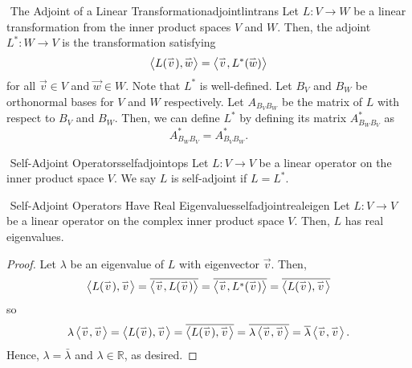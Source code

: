         \begin{definition}{\Stop\,\,The Adjoint of a Linear Transformation}{adjointlintrans}
            Let \(L:V\to W\) be a linear transformation from the inner product spaces \(V\) and \(W\). Then, the adjoint \(L^*:W\to V\) is the transformation satisfying
            \begin{equation*}
                \left\langle L(\overset{_{\rightharpoonup}}{v}),\overset{_{\rightharpoonup}}{w}\right\rangle=\left\langle \overset{_{\rightharpoonup}}{v},L^*(\overset{_{\rightharpoonup}}{w})\right\rangle
            \end{equation*}
            for all \(\vec{v}\in V\) and \(\vec{w}\in W\). Note that \(L^*\) is well-defined. Let \(B_V\) and \(B_W\) be orthonormal bases for \(V\) and \(W\) respectively. Let \(A_{B_VB_W}\) be the matrix of \(L\) with respect to \(B_V\) and \(B_W\). Then, we can define \(L^*\) by defining its matrix \(A^*_{B_WB_V}\) as
            \begin{equation*}
                A^*_{B_WB_V}=A_{B_VB_W}^*.
            \end{equation*}
        \end{definition}
        \begin{definition}{\Stop\,\,Self-Adjoint Operators}{selfadjointops}
            Let \(L:V\to V\) be a linear operator on the inner product space \(V\). We say \(L\) is self-adjoint if \(L=L^*\).
        \end{definition}
        \begin{theorem}{\Stop\,\,Self-Adjoint Operators Have Real Eigenvalues}{selfadjointrealeigen}
            Let \(L:V\to V\) be a linear operator on the complex inner product space \(V\). Then, \(L\) has real eigenvalues.
            \begin{proof}
                Let \(\lambda\) be an eigenvalue of \(L\) with eigenvector \(\vec{v}\). Then,
                \begin{equation*}
                    \left\langle L(\overset{_{\rightharpoonup}}{v}),\overset{_{\rightharpoonup}}{v}\right\rangle=\overline{\left\langle \overset{_{\rightharpoonup}}{v},L(\overset{_{\rightharpoonup}}{v})\right\rangle}=\overline{\left\langle \overset{_{\rightharpoonup}}{v},L^*(\overset{_{\rightharpoonup}}{v})\right\rangle}=\overline{\left\langle L(\overset{_{\rightharpoonup}}{v}),\overset{_{\rightharpoonup}}{v}\right\rangle}
                \end{equation*}
                so
                \begin{equation*}
                    \lambda\left\langle \overset{_{\rightharpoonup}}{v},\overset{_{\rightharpoonup}}{v}\right\rangle=\left\langle L(\overset{_{\rightharpoonup}}{v}),\overset{_{\rightharpoonup}}{v}\right\rangle=\overline{\left\langle L(\overset{_{\rightharpoonup}}{v}),\overset{_{\rightharpoonup}}{v}\right\rangle}=\overline{\lambda\left\langle \overset{_{\rightharpoonup}}{v},\overset{_{\rightharpoonup}}{v}\right\rangle}=\overline{\lambda}\left\langle \overset{_{\rightharpoonup}}{v},\overset{_{\rightharpoonup}}{v}\right\rangle.
                \end{equation*}
                Hence, \(\lambda=\bar{\lambda}\) and \(\lambda\in\mathbb{R}\), as desired.
            \end{proof}
        \end{theorem}
